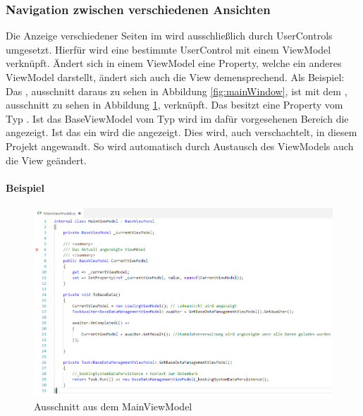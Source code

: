 \subsubsection{Navigation zwischen verschiedenen Ansichten}

Die Anzeige verschiedener Seiten im  wird ausschließlich durch UserControls umgesetzt. Hierfür wird eine bestimmte UserControl mit einem ViewModel verknüpft. Ändert sich in einem ViewModel eine Property, welche ein anderes ViewModel darstellt, ändert sich auch die View demensprechend. 
Als Beispiel: Das , ausschnitt daraus zu sehen in Abbildung \ref{fig:mainWindow}, ist mit dem , ausschnitt zu sehen in Abbildung \ref{fig:mainViewModel}, verknüpft. Das  besitzt eine Property  vom Typ . Ist das BaseViewModel vom Typ  wird im dafür vorgesehenen Bereich die  angezeigt. Ist das  ein  wird die  angezeigt. Dies wird, auch verschachtelt, in diesem Projekt angewandt. So wird automatisch durch Austausch des ViewModels auch die View geändert. 

\paragraph{Beispiel}

\begin{figure}[h]
	\begin{center}
		\includegraphics[width=\columnwidth]{Implementierung/MainViewModel.png}
	\end{center}
	\caption{Ausschnitt aus dem MainViewModel}
	\label{fig:mainViewModel}
\end{figure}

